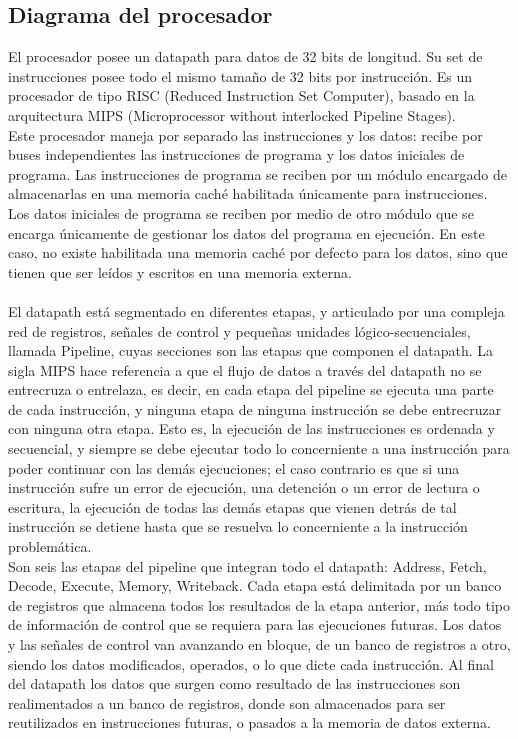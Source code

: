 \documentclass[twocolumn]{IEEEtran}
\begin{document}
\subsection{Diagrama del procesador}
\noindent
El procesador posee un datapath para datos de 32 bits de longitud. Su set de instrucciones posee todo el mismo tamaño de 32 bits por instrucción. Es un procesador de tipo RISC (Reduced Instruction Set Computer), basado en la arquitectura MIPS (Microprocessor without interlocked Pipeline Stages).\\
Este procesador maneja por separado las instrucciones y los datos: recibe por buses independientes las instrucciones de programa y los datos iniciales de programa. Las instrucciones de programa se reciben por un módulo encargado de almacenarlas en una memoria caché habilitada únicamente para instrucciones. Los datos iniciales de programa se reciben por medio de otro módulo que se encarga únicamente de gestionar los datos del programa en ejecución. En este caso, no existe habilitada una memoria caché por defecto para los datos, sino que tienen que ser leídos y escritos en una memoria externa.\\\\
El datapath está segmentado en diferentes etapas, y articulado por una compleja red de registros, señales de control y pequeñas unidades lógico-secuenciales, llamada Pipeline, cuyas secciones son las etapas que componen el datapath. La sigla MIPS hace referencia a que el flujo de datos a través del datapath no se entrecruza o entrelaza, es decir, en cada etapa del pipeline se ejecuta una parte de cada instrucción, y ninguna etapa de ninguna instrucción se debe entrecruzar con ninguna otra etapa. Esto es, la ejecución de las instrucciones es ordenada y secuencial, y siempre se debe ejecutar todo lo concerniente a una instrucción para poder continuar con las demás ejecuciones; el caso contrario es que si una instrucción sufre un error de ejecución, una detención o un error de lectura o escritura, la ejecución de todas las demás etapas que vienen detrás de tal instrucción se detiene hasta que se resuelva lo concerniente a la instrucción problemática.\\
Son seis las etapas del pipeline que integran todo el datapath: Address, Fetch, Decode, Execute, Memory, Writeback. Cada etapa está delimitada por un banco de registros que almacena todos los resultados de la etapa anterior, más todo tipo de información de control que se requiera para las ejecuciones futuras. Los datos y las señales de control van avanzando en bloque, de un banco de registros a otro, siendo los datos modificados, operados, o lo que dicte cada instrucción. Al final del datapath los datos que surgen como resultado de las instrucciones son realimentados a un banco de registros, donde son almacenados para ser reutilizados en instrucciones futuras, o pasados a la memoria de datos externa.\\
\end{document}
